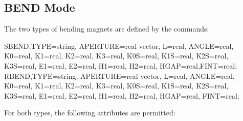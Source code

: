 \subsection{BEND \opalmap Mode}
\label{sec:opalmap:bend}
The two types of bending magnets are defined by the commands:
\begin{example}
SBEND,TYPE=string, APERTURE=real-vector, L=real,
      ANGLE=real, K0=real, K1=real, K2=real, K3=real,
      K0S=real, K1S=real, K2S=real, K3S=real, E1=real,
      E2=real, H1=real, H2=real, HGAP=real,FINT=real;
RBEND,TYPE=string, APERTURE=real-vector, L=real,
      ANGLE=real, K0=real, K1=real, K2=real, K3=real,
      K0S=real, K1S=real, K2S=real, K3S=real, E1=real,
      E2=real, H1=real, H2=real, HGAP=real, FINT=real;
\end{example}
For both types, the following attributes are permitted:
